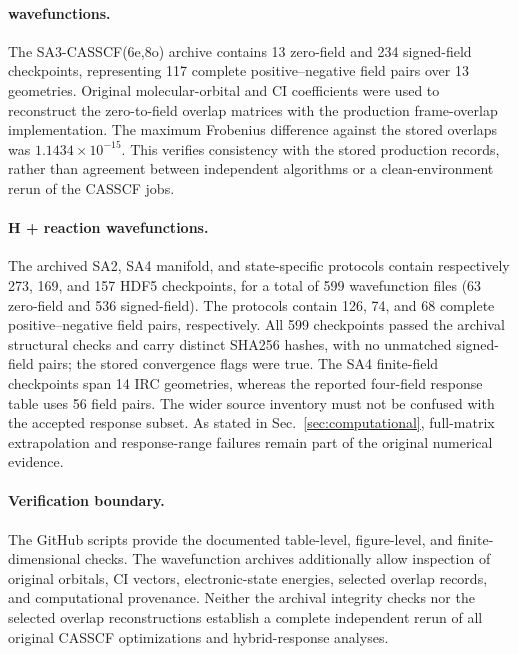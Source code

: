 \documentclass[aip,jcp,amsmath,amssymb,preprint,floatfix]{revtex4-1}
\begin{document}
\paragraph*{\texorpdfstring{}{B2} wavefunctions.}
The SA3-CASSCF(6e,8o) archive contains 13 zero-field and 234
signed-field checkpoints, representing 117 complete positive--negative
field pairs over 13 geometries. Original molecular-orbital and CI
coefficients were used to reconstruct the zero-to-field overlap
matrices with the production frame-overlap implementation.
The maximum Frobenius difference against the stored overlaps was
$1.1434\times10^{-15}$. This verifies consistency with the stored
production records, rather than agreement between independent
algorithms or a clean-environment rerun of the CASSCF jobs.

\paragraph*{H + \texorpdfstring{}{O2} reaction wavefunctions.}
The archived SA2, SA4 manifold, and state-specific protocols contain
respectively 273, 169, and 157 HDF5 checkpoints, for a total of
599 wavefunction files (63 zero-field and 536 signed-field).
The protocols contain 126, 74, and 68 complete positive--negative
field pairs, respectively. All 599 checkpoints passed the archival
structural checks and carry distinct SHA256 hashes, with no unmatched
signed-field pairs; the stored convergence flags were true. The SA4
finite-field checkpoints span 14 IRC geometries, whereas the
reported four-field response table uses 56 field pairs. The wider
source inventory must not be confused with the accepted response
subset. As stated in Sec.~\ref{sec:computational}, full-matrix
extrapolation and response-range failures remain part of the
original numerical evidence.

\paragraph*{Verification boundary.}
The GitHub scripts provide the documented table-level, figure-level,
and finite-dimensional checks. The wavefunction archives additionally
allow inspection of original orbitals, CI vectors, electronic-state
energies, selected overlap records, and computational provenance.
Neither the archival integrity checks nor the selected overlap
reconstructions establish a complete independent rerun of all original
CASSCF optimizations and hybrid-response analyses.


\end{document}
